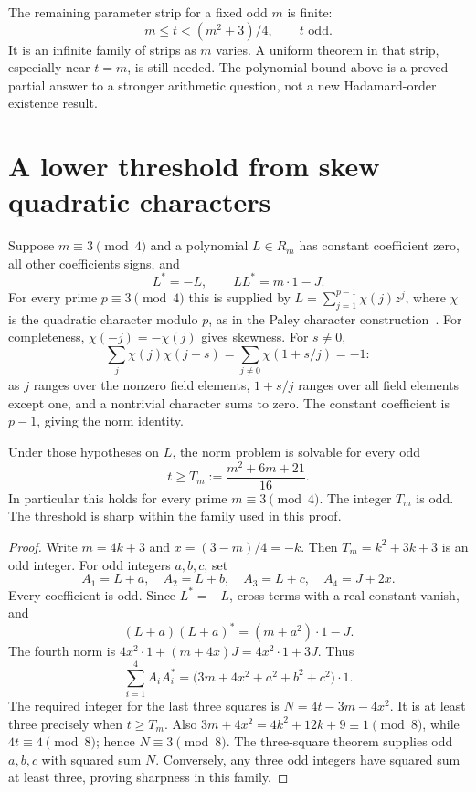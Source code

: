 The remaining parameter strip for a fixed odd $m$ is finite:
\[
 m\le t<(m^2+3)/4,\qquad t\text{ odd}.
\]
It is an infinite family of strips as $m$ varies. A uniform theorem in
that strip, especially near $t=m$, is still needed. The polynomial
bound above is a proved partial answer to a stronger arithmetic question,
not a new Hadamard-order existence result.

\section*{A lower threshold from skew quadratic characters}
Suppose $m\equiv3\pmod4$ and a polynomial $L\in R_m$ has constant
coefficient zero, all other coefficients signs, and
\[
 L^*=-L,\qquad LL^*=m\cdot1-J.
\]
For every prime $p\equiv3\pmod4$ this is supplied by
$L=\sum_{j=1}^{p-1}\chi(j)z^j$, where $\chi$ is the quadratic character
modulo $p$, as in the Paley character construction~\cite{s01:Paley}.
For completeness, $\chi(-j)=-\chi(j)$ gives skewness. For $s\ne0$,
\[
 \sum_j\chi(j)\chi(j+s)
 =\sum_{j\ne0}\chi(1+s/j)=-1:
\]
as $j$ ranges over the nonzero field elements, $1+s/j$ ranges over all
field elements except one, and a nontrivial character sums to zero.
The constant coefficient is $p-1$, giving the norm identity.

\begin{theorem}\label{s01:thm:skew}
Under those hypotheses on $L$, the norm problem is solvable for every
odd
\[
 t\ge T_m:=\frac{m^2+6m+21}{16}.
\]
In particular this holds for every prime $m\equiv3\pmod4$.
The integer $T_m$ is odd. The threshold is sharp within the family
used in this proof.
\end{theorem}
\begin{proof}
Write $m=4k+3$ and $x=(3-m)/4=-k$. Then
$T_m=k^2+3k+3$ is an odd integer.
For odd integers $a,b,c$, set
\[
 A_1=L+a,\quad A_2=L+b,\quad A_3=L+c,\quad A_4=J+2x.
\]
Every coefficient is odd. Since $L^*=-L$, cross terms with a real
constant vanish, and
\[
 (L+a)(L+a)^*=(m+a^2)\cdot1-J.
\]
The fourth norm is $4x^2\cdot1+(m+4x)J=4x^2\cdot1+3J$.
Thus
\[
 \sum_{i=1}^4 A_iA_i^*
 =\bigl(3m+4x^2+a^2+b^2+c^2\bigr)\cdot1.
\]
The required integer for the last three squares is
$N=4t-3m-4x^2$. It is at least three precisely when $t\ge T_m$.
Also $3m+4x^2=4k^2+12k+9\equiv1\pmod8$, while $4t\equiv4\pmod8$;
hence $N\equiv3\pmod8$. The three-square theorem supplies odd
$a,b,c$ with squared sum $N$. Conversely, any three odd integers have
squared sum at least three, proving sharpness in this family.
\end{proof}

